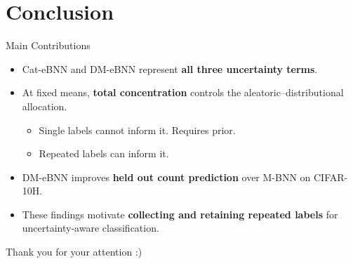 \section{Conclusion}

\begin{frame}{Main Contributions}
\label{frm:conclusion}
\label{frm:discussion}
\begin{itemize}
\setlength{\itemsep}{4mm}
\item Cat-eBNN and DM-eBNN represent \textbf{all three uncertainty terms}.
\item At fixed means, \textbf{total concentration} controls the aleatoric--distributional allocation.
\begin{itemize}
\item Single labels cannot inform it. Requires prior.
\item Repeated labels can inform it.
\end{itemize}
\item DM-eBNN improves \textbf{held out count prediction} over M-BNN on CIFAR-10H.
\item These findings motivate \textbf{collecting and retaining repeated labels} for uncertainty-aware classification.
\end{itemize}
\end{frame}

\begin{frame}[noframenumbering]{\strut}
\label{frm:thank-you}
\centering
{\LARGE Thank you for your attention :)\par}
\end{frame}

